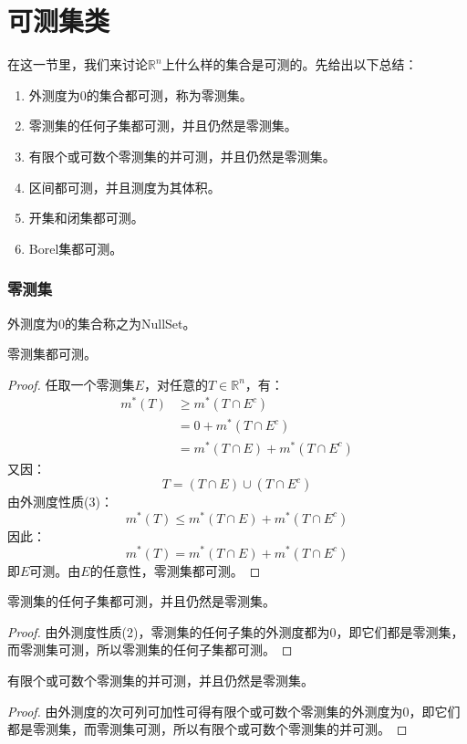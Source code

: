 \section{可测集类}
在这一节里，我们来讨论$\mathbb{R}^n$上什么样的集合是可测的。先给出以下总结：
\begin{enumerate}
	\item 外测度为$0$的集合都可测，称为零测集。
	\item 零测集的任何子集都可测，并且仍然是零测集。
	\item 有限个或可数个零测集的并可测，并且仍然是零测集。
	\item 区间都可测，并且测度为其体积。
	\item 开集和闭集都可测。
	\item Borel集都可测。
\end{enumerate}
\subsubsection{零测集}
\begin{definition}
	外测度为$0$的集合称之为\gls{NullSet}。
\end{definition}
\begin{theorem}
	零测集都可测。
\end{theorem}
\begin{proof}
	任取一个零测集$E$，对任意的$T\in \mathbb{R}^n$，有：
	\begin{align*}
		m^*(T)&\geqslant m^*(T\cap E^c) \\
		&=0+m^*(T\cap E^c) \\
		&=m^*(T\cap E)+m^*(T\cap E^c)
	\end{align*}
	又因：
	\begin{equation*}
		T=(T\cap E)\cup(T\cap E^c)
	\end{equation*}
	由外测度性质(3)：
	\begin{equation*}
		m^*(T)\leqslant m^*(T\cap E)+m^*(T\cap E^c)
	\end{equation*}
	因此：
	\begin{equation*}
		m^*(T)=m^*(T\cap E)+m^*(T\cap E^c)
	\end{equation*}
	即$E$可测。由$E$的任意性，零测集都可测。
\end{proof}
\begin{theorem}
	零测集的任何子集都可测，并且仍然是零测集。
\end{theorem}
\begin{proof}
	由外测度性质(2)，零测集的任何子集的外测度都为$0$，即它们都是零测集，而零测集可测，所以零测集的任何子集都可测。
\end{proof}
\begin{theorem}
	有限个或可数个零测集的并可测，并且仍然是零测集。
\end{theorem}
\begin{proof}
	由外测度的次可列可加性可得有限个或可数个零测集的外测度为$0$，即它们都是零测集，而零测集可测，所以有限个或可数个零测集的并可测。
\end{proof}
